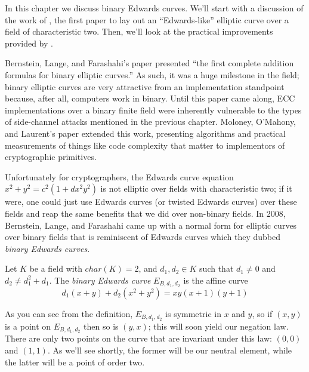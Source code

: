 \label{chp:bec}

In this chapter we discuss binary Edwards curves.
We'll start with a discussion of the work of \cite{bernstein2008binary}, the
    first paper to lay out an ``Edwards-like'' elliptic curve over a field of
    characteristic two.
Then, we'll look at the practical improvements provided by
    \cite{moloneyefficient}.

Bernstein, Lange, and Farashahi's paper \cite{bernstein2008binary} presented
    ``the first complete addition formulas for binary elliptic curves.''
As such, it was a huge milestone in the field; binary elliptic curves are very
    attractive from an implementation standpoint because, after all, computers
    work in binary.
Until this paper came along, ECC implementations over a binary finite field
    were inherently vulnerable to the types of side-channel attacks mentioned
    in the previous chapter.
Moloney, O'Mahony, and Laurent's paper \cite{moloneyefficient} extended this
    work, presenting algorithms and practical measurements of things like code
    complexity that matter to implementors of cryptographic primitives.


Unfortunately for cryptographers, the Edwards curve equation $x^2 + y^2 = c^2(1
    + dx^2y^2)$ is not elliptic over fields with characteristic two; if it
    were, one could just use Edwards curves (or twisted Edwards curves) over
    these fields and reap the same benefits that we did over non-binary fields.
In 2008, Bernstein, Lange, and Farashahi came up with a normal form for
    elliptic curves over binary fields that is reminiscent of Edwards curves
    which they dubbed \textit{binary Edwards curves}.

\begin{dfn}
Let $K$ be a field with $char(K) = 2$, and $d_1, d_2 \in K$ such that
    $d_1 \ne 0$ and $d_2 \ne d_1^2 + d_1$.
The \textit{binary Edwards curve} $E_{B, d_1, d_2}$ is the affine curve
\[
d_1(x + y) + d_2(x^2 + y^2) = xy(x + 1)(y + 1)
\]
\end{dfn}

As you can see from the definition, $E_{B, d_1, d_2}$ is symmetric in $x$ and
    $y$, so if $(x, y)$ is a point on $E_{B, d_1, d_2}$ then so is $(y, x)$;
    this will soon yield our negation law.
There are only two points on the curve that are invariant under this law: $(0,
    0)$ and $(1, 1)$.
As we'll see shortly, the former will be our neutral element, while the latter
    will be a point of order two.

